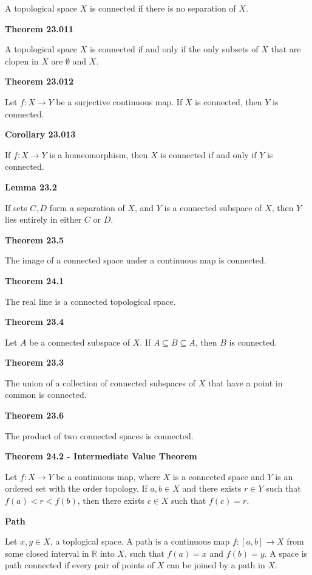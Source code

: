 \documentclass{article}
\begin{document}
	A topological space $X$ is connected if there is no separation of $X$.

\medskip\noindent\textbf{Theorem 23.011}

	A topological space $X$ is connected if and only if the only subsets of $X$ that are clopen in $X$ are $\emptyset$ and $X$.

\medskip\noindent\textbf{Theorem 23.012}

	Let $f: X \to Y$ be a surjective continuous map.
	If $X$ is connected, then $Y$ is connected.

\medskip\noindent\textbf{Corollary 23.013}

	If $f: X \to Y$ is a homeomorphism, then $X$ is connected if and only if $Y$ is connected.

\medskip\noindent\textbf{Lemma 23.2}

	If sets $C, D$ form a separation of $X$, and $Y$ is a connected subspace of $X$, then $Y$ lies entirely in either $C$ or $D$.

\medskip\noindent\textbf{Theorem 23.5}

	The image of a connected space under a continuous map is connected.

\medskip\noindent\textbf{Theorem 24.1}

	The real line is a connected topological space.

\medskip\noindent\textbf{Theorem 23.4}

	Let $A$ be a connected subspace of $X$. If $A \subseteq B \subseteq \overline A$, then $B$ is connected.

\medskip\noindent\textbf{Theorem 23.3}

	The union of a collection of connected subspaces of $X$ that have a point in common is connected.

\medskip\noindent\textbf{Theorem 23.6}

	The product of two connected spaces is connected.

\medskip\noindent\textbf{Theorem 24.2 - Intermediate Value Theorem}

    Let $f: X \to Y$ be a continuous map, where $X$ is a connected space and $Y$ is an ordered set with the order topology.
    If $a,b \in X$ and there exists $r \in Y$ such that $f(a) < r < f(b)$, then there exists $c \in X$ such that $f(c) = r$.

\medskip\noindent\textbf{Path}

    Let $x,y \in X$, a toplogical space.
    A path is a continuous map $f: [a,b] \to X$ from some closed interval in $\mathbb R$ into $X$, such that $f(a) = x$ and $f(b) = y$.
    A space is path connected if every pair of points of $X$ can be joined by a path in $X$.
\end{document}
